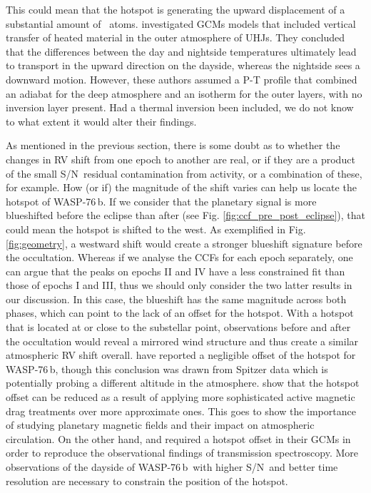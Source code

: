 \documentclass{aa}
\newcommand{\feI}{\ion{Fe}{i}}
\newcommand{\snr}{S/N}
\newcommand{\planet}{WASP-76\,b}
\begin{document}
This could mean that the hotspot is generating the upward displacement of a substantial amount of \feI\ atoms. \citet{sainsbury-martinez2023} investigated GCMs models that included vertical transfer of heated material in the outer atmosphere of UHJs. They concluded that the differences between the day and nightside temperatures ultimately lead to transport in the upward direction on the dayside, whereas the nightside sees a downward motion. However, these authors assumed a P-T profile that combined an adiabat for the deep atmosphere and an isotherm for the outer layers, with no inversion layer present. Had a thermal inversion been included, we do not know to what extent it would alter their findings. 

As mentioned in the previous section, there is some doubt as to whether the changes in RV shift from one epoch to another are real, or if they are a product of the small \snr\, residual contamination from activity, or a combination of these, for example. How (or if) the magnitude of the shift varies can help us locate the hotspot of \planet. If we consider that the planetary signal is more blueshifted before the eclipse than after (see Fig. \ref{fig:ccf_pre_post_eclipse}), that could mean the hotspot is shifted to the west. As exemplified in Fig. \ref{fig:geometry}, a westward shift would create a stronger blueshift signature before the occultation. Whereas if we analyse the CCFs for each epoch separately, one can argue that the peaks on epochs II and IV have a less constrained fit than those of epochs I and III, thus we should only consider the two latter results in our discussion. In this case, the blueshift has the same magnitude across both phases, which can point to the lack of an offset for the hotspot. With a hotspot that is located at or close to the substellar point, observations before and after the occultation would reveal a mirrored wind structure and thus create a similar atmospheric RV shift overall. \citet{may2021} have reported a negligible offset of the hotspot for \planet, though this conclusion was drawn from Spitzer data which is potentially probing a different altitude in the atmosphere. \citet{beltz2022a} show that the hotspot offset can be reduced as a result of applying more sophisticated active magnetic drag treatments over more approximate ones. This goes to show the importance of studying planetary magnetic fields and their impact on atmospheric circulation. On the other hand, \citet{wardenier2021} and \citet{savel2022} required a hotspot offset in their GCMs in order to reproduce the observational findings of transmission spectroscopy. More observations of the dayside of \planet\, with higher \snr\ and better time resolution are necessary to constrain the position of the hotspot.
\end{document}
